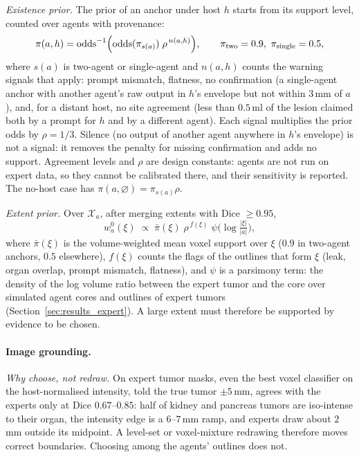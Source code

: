 \documentclass[fleqn,10pt]{olplainarticle}
\begin{document}
\emph{Existence prior.} The prior of an anchor under host $h$ starts from its support level, counted over agents with
provenance:
\begin{equation}
\label{eq:existence_prior}
\pi(a,h)=\operatorname{odds}^{-1}\Bigl(\operatorname{odds}(\pi_{s(a)})\;\rho^{\,n(a,h)}\Bigr),\qquad
\pi_{\text{two}}=0.9,\ \pi_{\text{single}}=0.5,
\end{equation}
where $s(a)$ is two-agent or single-agent and $n(a,h)$ counts the warning signals that apply: prompt mismatch, flatness,
no confirmation (a single-agent anchor with another agent's raw output in $h$'s envelope but not within $3$\,mm of $a$), and,
for a distant host, no site agreement (less than $0.5$\,ml of the lesion claimed both by a prompt for $h$ and by a different
agent). Each signal multiplies the prior odds by $\rho=1/3$. Silence (no output of another agent anywhere in $h$'s envelope)
is not a signal: it removes the penalty for missing confirmation and adds no support. Agreement levels and $\rho$ are
design constants: agents are not run on expert data, so they cannot be calibrated there, and their sensitivity is
reported. The no-host case has $\pi(a,\varnothing)=\pi_{s(a)}\rho$.

\emph{Extent prior.} Over $\mathcal{X}_a$, after merging extents with Dice $\ge0.95$,
\begin{equation}
\label{eq:extent_prior}
w^0_a(\xi)\;\propto\;\bar\pi(\xi)\;\rho^{\,f(\xi)}\;\psi\bigl(\log\tfrac{|\xi|}{|a|}\bigr),
\end{equation}
where $\bar\pi(\xi)$ is the volume-weighted mean voxel support over $\xi$ ($0.9$ in two-agent anchors, $0.5$ elsewhere),
$f(\xi)$ counts the flags of the outlines that form $\xi$ (leak, organ overlap, prompt mismatch, flatness), and $\psi$ is a
parsimony term: the density of the log volume ratio between the expert tumor and the core over simulated agent cores and
outlines of expert tumors (Section~\ref{sec:results_expert}). A large extent must therefore be supported by evidence to be
chosen.

\paragraph{Image grounding.}
\label{sec:grounding_details}
\emph{Why choose, not redraw.} On expert tumor masks, even the best voxel classifier on the host-normalised intensity, told
the true tumor $\pm5$\,mm, agrees with the experts only at Dice $0.67$--$0.85$: half of kidney and pancreas tumors are
iso-intense to their organ, the intensity edge is a $6$--$7$\,mm ramp, and experts draw about $2$\,mm outside its midpoint.
A level-set or voxel-mixture redrawing therefore moves correct boundaries. Choosing among the agents' outlines does not.
\end{document}
